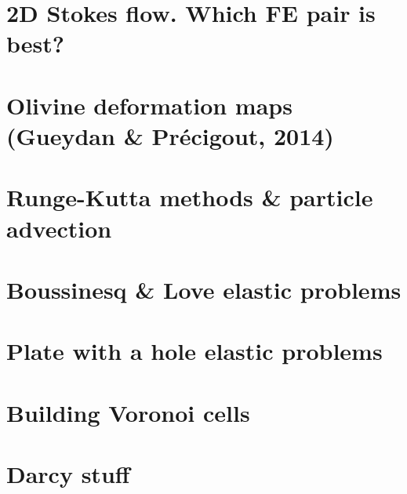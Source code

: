 \documentclass[a4paper,11pt]{report}
\begin{document}
\chapter{2D Stokes flow. Which FE pair is best? \label{f120}} %

\chapter{Olivine deformation maps (Gueydan \& Pr{\'e}cigout, 2014)  \label{f121}} %

\chapter{Runge-Kutta methods \& particle advection \label{f122}}%

\chapter{Boussinesq \& Love elastic problems\label{f123}} %

\chapter{Plate with a hole elastic problems \label{f124}} %

\chapter{Building Voronoi cells \label{f125}} %

\chapter{Darcy stuff\label{f126}} %
\end{document}
